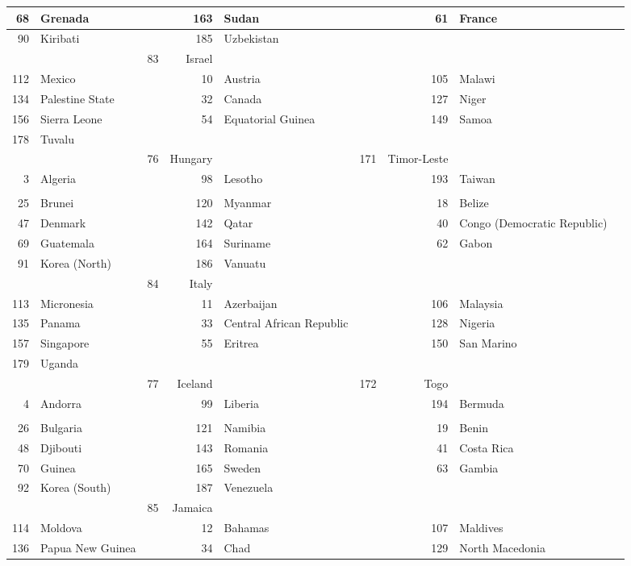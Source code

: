 \documentclass[12pt,a4paper]{article}
\begin{document}
\begin{longtable}{|r l c| r l c| r l c|}
68 & Grenada &  & 163 & Sudan &  & 61 & France &  \\ \hline
90 & Kiribati &  & 185 & Uzbekistan \\ \hline &  & 83 & Israel &  \\ \hline
112 & Mexico &  & 10 & Austria &  & 105 & Malawi &  \\ \hline
134 & Palestine State &  & 32 & Canada &  & 127 & Niger &  \\ \hline
156 & Sierra Leone &  & 54 & Equatorial Guinea &  & 149 & Samoa &  \\ \hline
178 & Tuvalu \\ \hline &  & 76 & Hungary &  & 171 & Timor-Leste &  \\ \hline
3 & Algeria &  & 98 & Lesotho &  & 193 & Taiwan \\ \hline &  \\ \hline
25 & Brunei &  & 120 & Myanmar &  & 18 & Belize &  \\ \hline
47 & Denmark &  & 142 & Qatar &  & 40 & Congo (Democratic Republic) &  \\ \hline
69 & Guatemala &  & 164 & Suriname &  & 62 & Gabon &  \\ \hline
91 & Korea (North) &  & 186 & Vanuatu \\ \hline &  & 84 & Italy &  \\ \hline
113 & Micronesia &  & 11 & Azerbaijan &  & 106 & Malaysia &  \\ \hline
135 & Panama &  & 33 & Central African Republic &  & 128 & Nigeria &  \\ \hline
157 & Singapore &  & 55 & Eritrea &  & 150 & San Marino &  \\ \hline
179 & Uganda \\ \hline &  & 77 & Iceland &  & 172 & Togo &  \\ \hline
4 & Andorra &  & 99 & Liberia &  & 194 & Bermuda \\ \hline &  \\ \hline
26 & Bulgaria &  & 121 & Namibia &  & 19 & Benin &  \\ \hline
48 & Djibouti &  & 143 & Romania &  & 41 & Costa Rica &  \\ \hline
70 & Guinea &  & 165 & Sweden &  & 63 & Gambia &  \\ \hline
92 & Korea (South) &  & 187 & Venezuela \\ \hline &  & 85 & Jamaica &  \\ \hline
114 & Moldova &  & 12 & Bahamas &  & 107 & Maldives &  \\ \hline
136 & Papua New Guinea &  & 34 & Chad &  & 129 & North Macedonia &  \\ \hline

\end{longtable}
\end{document}

